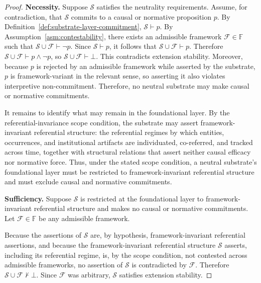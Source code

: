 \begin{proof}

  \noindent
  \textbf{Necessity.}
  Suppose $\mathcal{S}$ satisfies the neutrality requirements.
  Assume, for contradiction, that $\mathcal{S}$
  commits to a causal or normative proposition $p$.
  By Definition~\ref{def:substrate-layer-commitment},
  $\mathcal{S} \vdash p$.
  By Assumption~\ref{asm:contestability},
  there exists an admissible framework
  $\mathcal{F} \in \mathbb{F}$
  such that
  $\mathcal{S} \cup \mathcal{F} \vdash \neg p$.
  Since $\mathcal{S} \vdash p$,
  it follows that
  $\mathcal{S} \cup \mathcal{F} \vdash p$.
  Therefore
  $\mathcal{S} \cup \mathcal{F} \vdash p \land \neg p$,
  so
  $\mathcal{S} \cup \mathcal{F} \vdash \bot$.
  This contradicts extension stability.
  Moreover, because $p$ is rejected by an admissible framework
  while asserted by the substrate,
  $p$ is framework-variant in the relevant sense,
  so asserting it also violates interpretive non-commitment.
  Therefore, no neutral substrate may make
  causal or normative commitments.

  It remains to identify what may remain in the foundational layer.
  By the referential-invariance scope condition,
  the substrate may assert framework-invariant referential structure:
  the referential regimes by which entities, occurrences,
  and institutional artifacts are individuated,
  co-referred, and tracked across time,
  together with structural relations that assert neither causal efficacy
  nor normative force.
  Thus, under the stated scope condition,
  a neutral substrate's foundational layer must be restricted
  to framework-invariant referential structure
  and must exclude
  causal and normative commitments.

  \medskip
  \noindent
  \textbf{Sufficiency.}
  Suppose $\mathcal{S}$ is restricted at the foundational layer
  to framework-invariant referential structure
  and makes no causal or normative commitments.
  Let $\mathcal{F} \in \mathbb{F}$ be any admissible framework.

  Because the assertions of $\mathcal{S}$ are, by hypothesis,
  framework-invariant referential assertions, and because the
  framework-invariant referential structure $\mathcal{S}$ asserts,
  including its referential regime, is, by the scope condition,
  not contested across admissible frameworks, no assertion of
  $\mathcal{S}$ is contradicted by $\mathcal{F}$.
  Therefore
  $\mathcal{S} \cup \mathcal{F} \not\vdash \bot$.
  Since $\mathcal{F}$ was arbitrary,
  $\mathcal{S}$ satisfies extension stability.


\end{proof}
